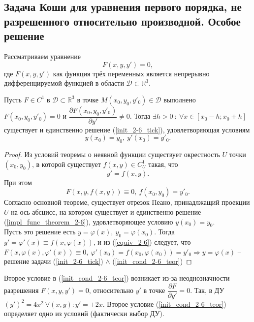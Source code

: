     \subsection*{Задача Коши для уравнения первого порядка, не разрешенного относительно производной. Особое решение}
    Рассматриваем уравнение
    \begin{equation}\label{init_2-6_tick}
        F(x, y, y') = 0,
    \end{equation}
    где $F(x, y, y')$ как функция трёх переменных является непрерывно дифференцируемой функцией в области $\mathcal{D} \subset \mathbb{R}^3$.
    \begin{theorem}
		Пусть $F \in C^1$ в $\mathcal{D} \subset \mathbb{R}^3$ в точке $M(x_0, y_0, y'_0) \in \mathcal{D}$ выполнено $F(x_0, y_0, y'_0) = 0$ и $\dfrac{\partial F(x_0, y_0, y'_0)}{\partial y'} \neq 0$. Тогда $\exists h > 0\ : \ \forall x \in [x_0 - h; x_0 + h]$ существует и единственно решение (\ref{init_2-6_tick}), удовлетворяющая условиям
    \begin{equation}\label{init_cond_2-6_teor}
        y(x_0) = y_0,\ y'(x_0) = y'_0.
    \end{equation}		
	\end{theorem}
	\begin{proof}
	    Из условий теоремы о неявной функции существует окрестность $U$ точки $(x_0, y_0)$, в которой существует $f(x, y) \in C^1_U$ такая, что
	    \begin{equation}\label{impl_func_theorem_2-6}
	        y' = f(x, y).
	    \end{equation}
	    При этом
	    \begin{equation} \label{equiv_2-6}
	       F(x, y, f(x, y)) \equiv 0,\ f(x_0, y_0) = y'_0.
	    \end{equation}
	    Согласно основной теореме, существует отрезок Пеано, принадлжащий проекции $U$ на ось абсцисс, на котором существует и единственно решение (\ref{impl_func_theorem_2-6}), удовлетворяющее условию $y(x_0) = y_0$.\\
	    Пусть это решение есть $y = \varphi(x),\ y_0 = \varphi(x_0)$. Тогда $y' = \varphi'(x) \equiv f (x, \varphi(x))$, и из (\ref{equiv_2-6}) следует, что $F(x, \varphi(x), \varphi'(x)) \equiv 0,\ \varphi'(x_0) = f(x_0, \varphi(x_0)) = y'_0 \Rightarrow y = \varphi(x)$ -- решение задачи (\ref{init_2-6_tick}) $\wedge$ (\ref{init_cond_2-6_teor})
	\end{proof}
	\begin{remark}
	    Второе условие в (\ref{init_cond_2-6_teor}) возникает из-за неоднозначности разрешения $F(x, y, y') = 0$, относительно $y'$ в точке $\dfrac{\partial F}{\partial y'} = 0$. Так, в ДУ $(y')^2 = 4x^2\ \forall(x, y) : y' = \pm2x$. Второе условие (\ref{init_cond_2-6_teor}) определяет одно из условий (фактически выбор ДУ).
	\end{remark} 
